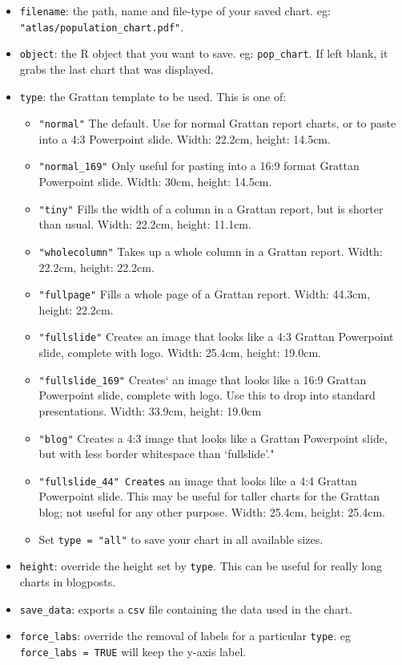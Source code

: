 \documentclass[]{book}
\providecommand{\tightlist}{%
  \setlength{\itemsep}{0pt}\setlength{\parskip}{0pt}}
\begin{document}
\begin{itemize}
\tightlist
\item
  \texttt{filename}: the path, name and file-type of your saved chart. eg: \texttt{"atlas/population\_chart.pdf"}.
\item
  \texttt{object}: the R object that you want to save. eg: \texttt{pop\_chart}. If left blank, it grabs the last chart that was displayed.
\item
  \texttt{type}: the Grattan template to be used. This is one of:

  \begin{itemize}
  \tightlist
  \item
    \texttt{"normal"} The default. Use for normal Grattan report charts, or to paste into a 4:3 Powerpoint slide. Width: 22.2cm, height: 14.5cm.
  \item
    \texttt{"normal\_169"} Only useful for pasting into a 16:9 format Grattan Powerpoint slide. Width: 30cm, height: 14.5cm.
  \item
    \texttt{"tiny"} Fills the width of a column in a Grattan report, but is shorter than usual. Width: 22.2cm, height: 11.1cm.
  \item
    \texttt{"wholecolumn"} Takes up a whole column in a Grattan report. Width: 22.2cm, height: 22.2cm.
  \item
    \texttt{"fullpage"} Fills a whole page of a Grattan report. Width: 44.3cm, height: 22.2cm.
  \item
    \texttt{"fullslide"} Creates an image that looks like a 4:3 Grattan Powerpoint slide, complete with logo. Width: 25.4cm, height: 19.0cm.
  \item
    \texttt{"fullslide\_169"} Creates` an image that looks like a 16:9 Grattan Powerpoint slide, complete with logo. Use this to drop into standard presentations. Width: 33.9cm, height: 19.0cm
  \item
    \texttt{"blog"} Creates a 4:3 image that looks like a Grattan Powerpoint slide, but with less border whitespace than `fullslide'."
  \item
    \texttt{"fullslide\_44"\ Creates} an image that looks like a 4:4 Grattan Powerpoint slide. This may be useful for taller charts for the Grattan blog; not useful for any other purpose. Width: 25.4cm, height: 25.4cm.
  \item
    Set \texttt{type\ =\ "all"} to save your chart in all available sizes.
  \end{itemize}
\item
  \texttt{height}: override the height set by \texttt{type}. This can be useful for really long charts in blogposts.
\item
  \texttt{save\_data}: exports a \texttt{csv} file containing the data used in the chart.
\item
  \texttt{force\_labs}: override the removal of labels for a particular \texttt{type}. eg \texttt{force\_labs\ =\ TRUE} will keep the y-axis label.
\end{itemize}
\end{document}
